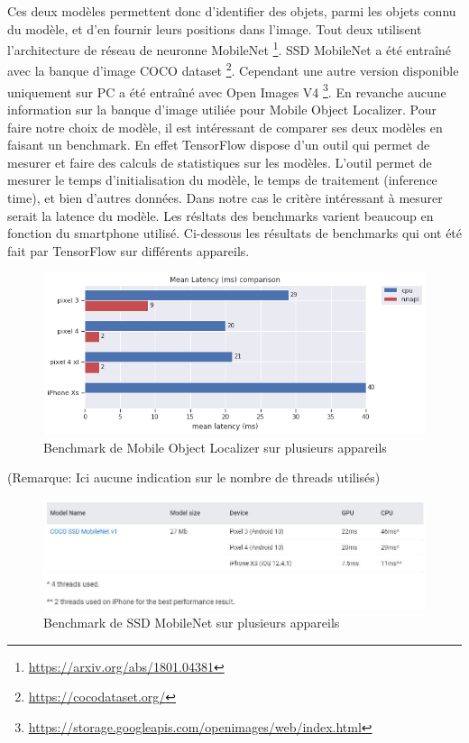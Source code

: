 \documentclass[UTF8]{EPURapport}
\begin{document}
Ces deux modèles permettent donc d'identifier des objets, parmi les objets connu du modèle, et d'en fournir leurs positions dans l'image. Tout deux utilisent l'architecture de réseau de neuronne MobileNet \footnote{\url{https://arxiv.org/abs/1801.04381}}. SSD MobileNet a été entraîné avec la banque d'image COCO dataset \footnote{\url{https://cocodataset.org/}}. Cependant une autre version disponible uniquement sur PC a été entraîné avec Open Images V4 \footnote{\url{https://storage.googleapis.com/openimages/web/index.html}}. En revanche aucune information sur la banque d'image utiliée pour Mobile Object Localizer.
Pour faire notre choix de modèle, il est intéressant de comparer ses deux modèles en faisant un benchmark. En effet TensorFlow dispose d'un outil qui permet de mesurer et faire des calculs de statistiques sur les modèles. L'outil permet de mesurer le temps d'initialisation du modèle, le temps de traitement (inference time), et bien d'autres données. Dans notre cas le critère intéressant à mesurer serait la latence du modèle. Les résltats des benchmarks varient beaucoup en fonction du smartphone utilisé. Ci-dessous les résultats de benchmarks qui ont été fait par TensorFlow sur différents appareils.

\begin{figure}[h!]
\centering
  \includegraphics[width=\textwidth]{images/bench_mol.png}
  \caption{Benchmark de Mobile Object Localizer sur plusieurs appareils}
  \label{fig:benchmol}
\end{figure}

(Remarque: Ici aucune indication sur le nombre de threads utilisés)

\begin{figure}[h!]
\centering
  \includegraphics[width=\textwidth]{images/bench_ssd_mobilenet.jpg}
  \caption{Benchmark de SSD MobileNet sur plusieurs appareils}
  \label{fig:benchssdmobilenet}
\end{figure}
\end{document}
